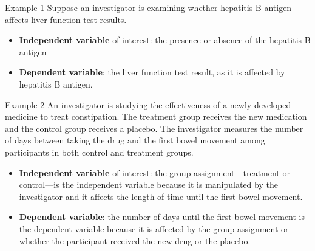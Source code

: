 \documentclass[
  ignorenonframetext,
]{beamer}
\begin{document}
\begin{frame}{Example 1}
\protect\hypertarget{example-1}{}
Suppose an investigator is examining whether hepatitis B antigen affects
liver function test results.

\begin{itemize}[<+->]
\item
  {\textbf{Independent variable}} of interest: the presence or absence
  of the hepatitis B antigen
\item
  {\textbf{Dependent variable}}: the liver function test result, as it
  is affected by hepatitis B antigen.
\end{itemize}
\end{frame}

\begin{frame}{Example 2}
\protect\hypertarget{example-2}{}
An investigator is studying the effectiveness of a newly developed
medicine to treat constipation. The treatment group receives the new
medication and the control group receives a placebo. The investigator
measures the number of days between taking the drug and the first bowel
movement among participants in both control and treatment groups.

\begin{itemize}
\item
  {\textbf{Independent variable}} of interest: the group
  assignment---treatment or control---is the independent variable
  because it is manipulated by the investigator and it affects the
  length of time until the first bowel movement.
\item
  {\textbf{Dependent variable}}: the number of days until the first
  bowel movement is the dependent variable because it is affected by the
  group assignment or whether the participant received the new drug or
  the placebo.
\end{itemize}
\end{frame}
\end{document}
